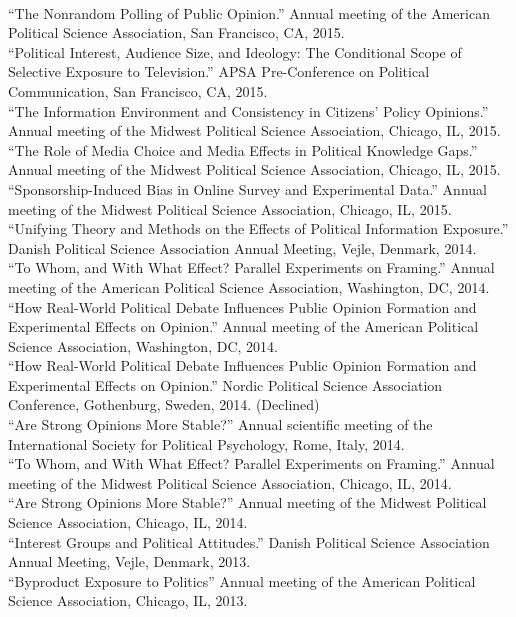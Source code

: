 \documentclass[12pt]{article}
\renewcommand{\section}[1]{\pagebreak[3]%
    \llap{\scshape\smash{\parbox[t]{\marginparwidth}{\raggedright {\color{lg}#1}}}}%
    \vspace{-\baselineskip}\par}
\newcommand{\topic}[1]{\pagebreak[3]\indent {\color{lg}{\footnotesize #1 }}\\}
\newcommand{\entry}[1]{\indent {\color{lg}\guillemotright}\hspace{2pt}#1\vspace{.25em}\\}
\begin{document}
\section{Conference\\Papers\\and\\Invited\\Presentations}
\topic{Conference Papers}
\entry{``The Nonrandom Polling of Public Opinion.'' Annual meeting of the American Political Science Association, San Francisco, CA, 2015.}
\entry{``Political Interest, Audience Size, and Ideology: The Conditional Scope of Selective Exposure to Television.'' APSA Pre-Conference on Political Communication, San Francisco, CA, 2015.}
\entry{``The Information Environment and Consistency in Citizens' Policy Opinions.'' Annual meeting of the Midwest Political Science Association, Chicago, IL, 2015.}
\entry{``The Role of Media Choice and Media Effects in Political Knowledge Gaps.'' Annual meeting of the Midwest Political Science Association, Chicago, IL, 2015.}
\entry{``Sponsorship-Induced Bias in Online Survey and Experimental Data.'' Annual meeting of the Midwest Political Science Association, Chicago, IL, 2015.}
\entry{``Unifying Theory and Methods on the Effects of Political Information Exposure.'' Danish Political Science Association Annual Meeting, Vejle, Denmark, 2014.}
\entry{``To Whom, and With What Effect? Parallel Experiments on Framing.'' Annual meeting of the American Political Science Association, Washington, DC, 2014.}
\entry{``How Real-World Political Debate Influences Public Opinion Formation and Experimental Effects on Opinion.'' Annual meeting of the American Political Science Association, Washington, DC, 2014.}
\entry{``How Real-World Political Debate Influences Public Opinion Formation and Experimental Effects on Opinion.'' Nordic Political Science Association Conference, Gothenburg, Sweden, 2014. (Declined)}
\entry{``Are Strong Opinions More Stable?'' Annual scientific meeting of the International Society for Political Psychology, Rome, Italy, 2014.}
\entry{``To Whom, and With What Effect? Parallel Experiments on Framing.'' Annual meeting of the Midwest Political Science Association, Chicago, IL, 2014.}
\entry{``Are Strong Opinions More Stable?'' Annual meeting of the Midwest Political Science Association, Chicago, IL, 2014.}
\entry{``Interest Groups and Political Attitudes.'' Danish Political Science Association Annual Meeting, Vejle, Denmark, 2013.}
\entry{``Byproduct Exposure to Politics'' Annual meeting of the American Political Science Association, Chicago, IL, 2013.}
\end{document}
